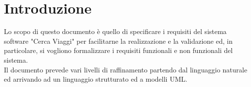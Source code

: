 %
%	 
%
\chapter{Introduzione}
Lo scopo di questo documento è quello di specificare i requisiti del sistema software "Cerca Viaggi" per facilitarne la realizzazione e la validazione ed, in particolare,
si vogliono formalizzare i requisiti funzionali e non funzionali del sistema. \\Il documento prevede vari livelli di raffinamento partendo dal linguaggio naturale
ed arrivando ad un linguaggio strutturato ed a modelli UML.
